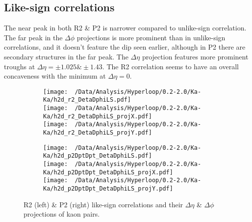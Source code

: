 \documentclass[12pt,a4paper,twoside]{report}
\begin{document}
\subsection{Like-sign correlations}
The near peak in both R2 \& P2 is narrower compared to unlike-sign correlation. The far peak in the $\Delta\phi$ projections is more prominent than in unlike-sign correlations, and it doesn't feature the dip seen earlier, although in P2 there are secondary structures in the far peak. The $\Delta\eta$ projection features more prominent troughs at $\Delta\eta=\pm1.025\&\pm1.43$. The R2 correlation seems to have an overall concaveness with the minimum at $\Delta\eta=0$.
\begin{figure}[H]
	\begin{subfigure}{0.49\linewidth}
		\texttt{[image: ~/Data/Analysis/Hyperloop/0.2-2.0/Ka-Ka/h2d\_r2\_DetaDphiLS.pdf]}\\
		\texttt{[image: ~/Data/Analysis/Hyperloop/0.2-2.0/Ka-Ka/h2d\_r2\_DetaDphiLS\_projX.pdf]}\\
		\texttt{[image: ~/Data/Analysis/Hyperloop/0.2-2.0/Ka-Ka/h2d\_r2\_DetaDphiLS\_projY.pdf]}\\
	\end{subfigure}
	\begin{subfigure}{0.49\linewidth}
		\texttt{[image: ~/Data/Analysis/Hyperloop/0.2-2.0/Ka-Ka/h2d\_p2DptDpt\_DetaDphiLS.pdf]}\\
		\texttt{[image: ~/Data/Analysis/Hyperloop/0.2-2.0/Ka-Ka/h2d\_p2DptDpt\_DetaDphiLS\_projX.pdf]}\\
		\texttt{[image: ~/Data/Analysis/Hyperloop/0.2-2.0/Ka-Ka/h2d\_p2DptDpt\_DetaDphiLS\_projY.pdf]}\\
	\end{subfigure}
	\caption{R2 (left) \& P2 (right) like-sign correlations and their $\Delta\eta$ \& $\Delta\phi$ projections of kaon pairs.}
\end{figure}
\end{document}
